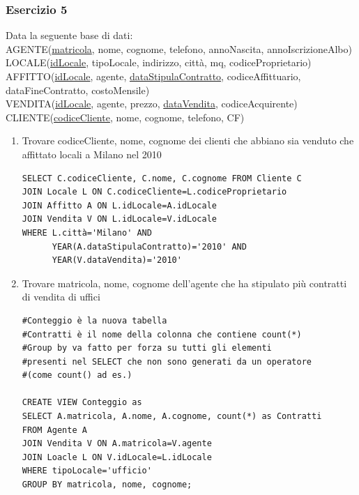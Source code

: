 \documentclass[a4paper]{article}
\begin{document}
\begin{enumerate}[leftmargin=*]
\subsubsection{Esercizio 5}
Data la seguente base di dati:\medskip\\
AGENTE(\underline{matricola}, nome, cognome, telefono, annoNascita, annoIscrizioneAlbo)\\
LOCALE(\underline{idLocale}, tipoLocale, indirizzo, città, mq, codiceProprietario)\\
AFFITTO(\underline{idLocale}, agente, \underline{dataStipulaContratto}, codiceAffittuario, dataFineContratto, costoMensile)\\
VENDITA(\underline{idLocale}, agente, prezzo, \underline{dataVendita}, codiceAcquirente)\\
CLIENTE(\underline{codiceCliente}, nome, cognome, telefono, CF)\medskip
\begin{enumerate}
<<<<<<< HEAD
\item Trovare codiceCliente, nome, cognome dei clienti che abbiano sia venduto che affittato locali a Milano nel 2010
\begin{verbatim}
SELECT C.codiceCliente, C.nome, C.cognome FROM Cliente C
JOIN Locale L ON C.codiceCliente=L.codiceProprietario
JOIN Affitto A ON L.idLocale=A.idLocale
JOIN Vendita V ON L.idLocale=V.idLocale
WHERE L.città='Milano' AND
      YEAR(A.dataStipulaContratto)='2010' AND
      YEAR(V.dataVendita)='2010'
\end{verbatim}
\item Trovare matricola, nome, cognome dell'agente che ha stipulato più contratti di vendita di uffici
\begin{verbatim}
#Conteggio è la nuova tabella
#Contratti è il nome della colonna che contiene count(*)
#Group by va fatto per forza su tutti gli elementi
#presenti nel SELECT che non sono generati da un operatore
#(come count() ad es.)

CREATE VIEW Conteggio as
SELECT A.matricola, A.nome, A.cognome, count(*) as Contratti
FROM Agente A
JOIN Vendita V ON A.matricola=V.agente
JOIN Loacle L ON V.idLocale=L.idLocale
WHERE tipoLocale='ufficio'
GROUP BY matricola, nome, cognome;


\end{verbatim}
\end{enumerate}
\end{enumerate}
\end{document}
